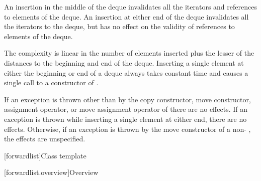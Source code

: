 \documentclass{wg21}
\begin{document}
\begin{itemdescr}
    \pnum
    \effects
    An insertion in the middle of the deque invalidates all the iterators and
    references to elements of the deque.
    An insertion at either end of the
    deque invalidates all the iterators to the deque, but has no effect on
    the validity of references to elements of the deque.

    \pnum
    \complexity
    The complexity is linear in the number of elements inserted plus the lesser
    of the distances to the beginning and end of the deque.
    Inserting a single element at either the beginning or end of a deque always takes constant time
    and causes a single call to a constructor of
    .

    \pnum
    \remarks
    If an exception is thrown other than by the
    copy constructor, move constructor,
    assignment operator, or move assignment operator of
    there are no effects.
    If an exception is thrown while inserting a single element at either end,
    there are no effects.
    Otherwise, if an exception is thrown by the move constructor of a
    non-
    , the effects are unspecified.
\end{itemdescr}

[forwardlist]{Class template }

[forwardlist.overview]{Overview}
\end{document}
